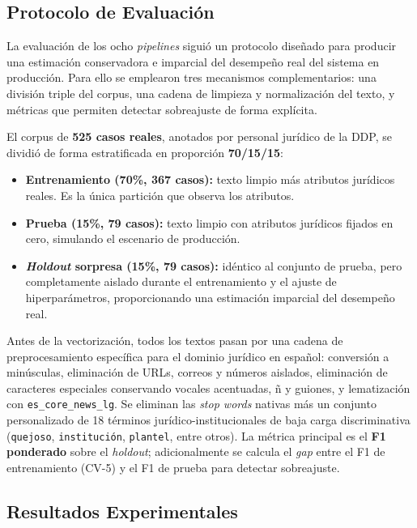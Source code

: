 \subsection{Protocolo de Evaluación}
\label{subsec:protocolo}

La evaluación de los ocho \textit{pipelines} siguió un protocolo diseñado para 
producir una estimación conservadora e imparcial del desempeño real del sistema 
en producción. Para ello se emplearon tres mecanismos complementarios: una 
división triple del corpus, una cadena de limpieza y normalización del texto, y 
métricas que permiten detectar sobreajuste de forma explícita.

El corpus de \textbf{525 casos reales}, anotados por personal jurídico de la DDP, 
se dividió de forma estratificada en proporción \textbf{70/15/15}:

\begin{itemize}
    \item \textbf{Entrenamiento (70\%, 367 casos):} texto limpio más atributos 
    jurídicos reales. Es la única partición que observa los atributos.
    \item \textbf{Prueba (15\%, 79 casos):} texto limpio con atributos jurídicos 
    fijados en cero, simulando el escenario de producción.
    \item \textbf{\textit{Holdout} sorpresa (15\%, 79 casos):} idéntico al 
    conjunto de prueba, pero completamente aislado durante el entrenamiento y el 
    ajuste de hiperparámetros, proporcionando una estimación imparcial del 
    desempeño real.
\end{itemize}

Antes de la vectorización, todos los textos pasan por una cadena de 
preprocesamiento específica para el dominio jurídico en español: conversión a 
minúsculas, eliminación de URLs, correos y números aislados, eliminación de 
caracteres especiales conservando vocales acentuadas, ñ y guiones, y lematización 
con \texttt{es\_core\_news\_lg}. Se eliminan las \textit{stop words} nativas más 
un conjunto personalizado de 18 términos jurídico-institucionales de baja carga 
discriminativa (\texttt{quejoso}, \texttt{institución}, \texttt{plantel}, entre 
otros). La métrica principal es el \textbf{F1 ponderado} sobre el 
\textit{holdout}; adicionalmente se calcula el \textit{gap} entre el F1 de 
entrenamiento (CV-5) y el F1 de prueba para detectar sobreajuste.

\subsection{Resultados Experimentales}
\label{subsec:resultados}

